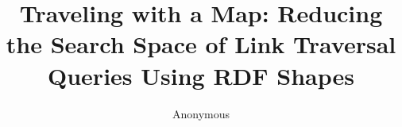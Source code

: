 \documentclass[runningheads]{llncs}
\newif\ifanonymous
\begin{document}
\anonymoustrue

%
\title{Traveling with a Map: Reducing the Search Space of Link Traversal Queries Using RDF Shapes}
%
%
\ifanonymous
    \author{Anonymous}
\else
    \author{Bryan-Elliott Tam\inst{1}\orcidID{0000-0003-3467-9755} \and
    Ruben Taelman\inst{1}\orcidID{0000-0001-5118-256X} \and
    Pieter Colpaert\inst{1}\orcidID{0000-0001-6917-2167}}
    \authorrunning{B.-E. Tam et al.}
    \institute{Universiteit Gent, Ghent, Belgium \\
    \email{\{firstname.lastname\}@ugent.be}}
\fi


%
\maketitle              %
%










%


\printbibliography
{}
\end{document}

